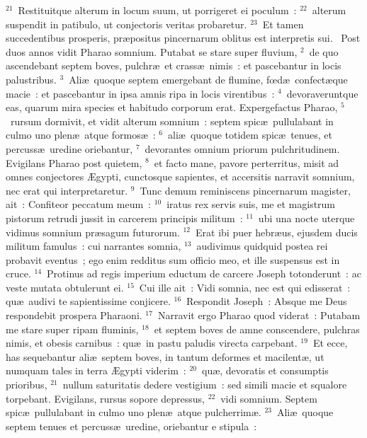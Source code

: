 ${}^{21}$~Restituitque alterum in locum suum, ut porrigeret ei poculum~:
${}^{22}$~alterum suspendit in patibulo, ut conjectoris veritas probaretur.
${}^{23}$~Et tamen succedentibus prosperis, pr\ae positus pincernarum oblitus est interpretis sui.
~Post duos annos vidit Pharao somnium. Putabat se stare super fluvium,
${}^{2}$~de quo ascendebant septem boves, pulchr\ae\ et crass\ae\ nimis~: et pascebantur in locis palustribus.
${}^{3}$~Ali\ae\ quoque septem emergebant de flumine, fœd\ae\ confect\ae que macie~: et pascebantur in ipsa amnis ripa in locis virentibus~:
${}^{4}$~devoraveruntque eas, quarum mira species et habitudo corporum erat. Expergefactus Pharao,
${}^{5}$~rursum dormivit, et vidit alterum somnium~: septem spic\ae\ pullulabant in culmo uno plen\ae\ atque formos\ae~:
${}^{6}$~ali\ae\ quoque totidem spic\ae\ tenues, et percuss\ae\ uredine oriebantur,
${}^{7}$~devorantes omnium priorum pulchritudinem. Evigilans Pharao post quietem,
${}^{8}$~et facto mane, pavore perterritus, misit ad omnes conjectores \AE gypti, cunctosque sapientes, et accersitis narravit somnium, nec erat qui interpretaretur.
${}^{9}$~Tunc demum reminiscens pincernarum magister, ait~: Confiteor peccatum meum~:
${}^{10}$~iratus rex servis suis, me et magistrum pistorum retrudi jussit in carcerem principis militum~:
${}^{11}$~ubi una nocte uterque vidimus somnium pr\ae sagum futurorum.
${}^{12}$~Erat ibi puer hebr\ae us, ejusdem ducis militum famulus~: cui narrantes somnia,
${}^{13}$~audivimus quidquid postea rei probavit eventus~; ego enim redditus sum officio meo, et ille suspensus est in cruce.
${}^{14}$~Protinus ad regis imperium eductum de carcere Joseph totonderunt~: ac veste mutata obtulerunt ei.
${}^{15}$~Cui ille ait~: Vidi somnia, nec est qui edisserat~: qu\ae\ audivi te sapientissime conjicere.
${}^{16}$~Respondit Joseph~: Absque me Deus respondebit prospera Pharaoni.
${}^{17}$~Narravit ergo Pharao quod viderat~: Putabam me stare super ripam fluminis,
${}^{18}$~et septem boves de amne conscendere, pulchras nimis, et obesis carnibus~: qu\ae\ in pastu paludis virecta carpebant.
${}^{19}$~Et ecce, has sequebantur ali\ae\ septem boves, in tantum deformes et macilent\ae , ut numquam tales in terra \AE gypti viderim~:
${}^{20}$~qu\ae , devoratis et consumptis prioribus,
${}^{21}$~nullum saturitatis dedere vestigium~: sed simili macie et squalore torpebant. Evigilans, rursus sopore depressus,
${}^{22}$~vidi somnium. Septem spic\ae\ pullulabant in culmo uno plen\ae\ atque pulcherrim\ae .
${}^{23}$~Ali\ae\ quoque septem tenues et percuss\ae\ uredine, oriebantur e stipula~:

